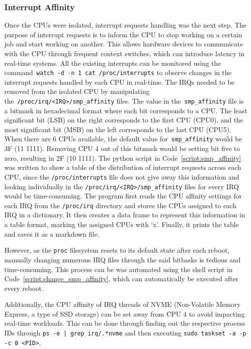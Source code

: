 \documentclass[MMR,Master,english]{twbook}
\begin{document}
\subsubsection{Interrupt Affinity}\label{subsubsec:irq_handling}
Once the CPUs were isolated, interrupt requests handling was the next step. The purpose of interrupt requests is to inform the CPU to stop working on a certain job and start working on another. This allows hardware devices to communicate with the CPU through frequent context switches, which can introduce latency in real-time systems. All the existing interrupts can be monitored using the command~\texttt{watch -d -n 1 cat /proc/interrupts} to observe changes in the interrupt requests handled by each CPU in real-time. The IRQs needed to be removed from the isolated CPU by manipulating the~\texttt{/proc/irq/<IRQ>/smp\_affinity} files. The value in the~\texttt{smp\_affinity} file is a bitmask in hexadecimal format where each bit corresponds to a CPU. The least significant bit (LSB) on the right corresponds to the first CPU (CPU0), and the most significant bit (MSB) on the left corresponds to the last CPU (CPU5). When there are 6 CPUs available, the default value for~\texttt{smp\_affinity} would be 3F (11 1111). Removing CPU 4 out of this bitmask would be setting bit five to zero, resulting in 2F (10 1111). The python script in Code~\ref{script:smp_affinity} was written to show a table of the distribution of interrupt requests across each CPU, since the \texttt{/proc/interrupts} file does not give away this information and looking individually in the \texttt{/proc/irq/<IRQ>/smp\_affinity} files for every IRQ would be time-consuming. The program first reads the CPU affinity settings for each IRQ from the \texttt{/proc/irq} directory and stores the CPUs assigned to each IRQ in a dictionary. It then creates a data frame to represent this information in a table format, marking the assigned CPUs with ‘x’. Finally, it prints the table and saves it as a markdown file. 

\bigskip \noindent However, as the \texttt{proc} filesystem resets to its default state after each reboot, manually changing numerous IRQ files through the said bitbasks is tedious and time-consuming. This process can be was automated using the shell script in Code~\ref{script:change_smp_affinity}, which can automatically be executed after every reboot. 

\bigskip \noindent Additionally, the CPU affinity of IRQ threads of NVME (Non-Volatile Memory Express, a type of SSD storage) can be set away from CPU 4 to avoid impacting real-time workloads. This can be done through finding out the respective process IDs through \texttt{ps -e | grep irq/.*nvme} and then executing \texttt{sudo taskset -a -p -c 0 <PID>}.
\end{document}
